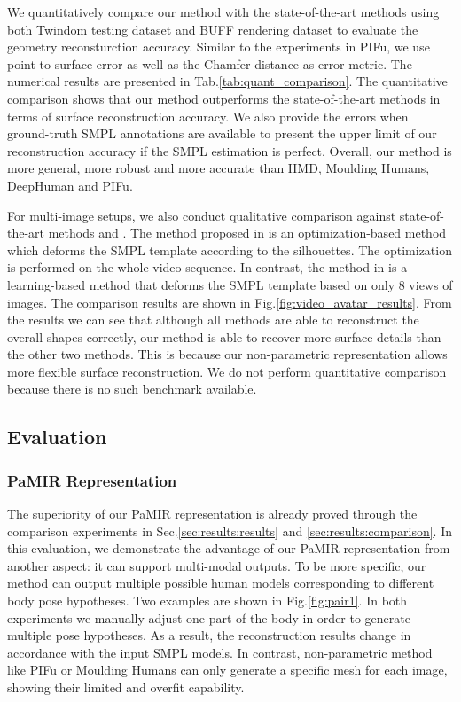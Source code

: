 We quantitatively compare our method with the state-of-the-art methods using both Twindom testing dataset and BUFF rendering dataset to evaluate the geometry reconsturction accuracy. 
Similar to the experiments in PIFu\cite{pifuSHNMKL19}, we use point-to-surface error as well as the Chamfer distance as error metric. 
The numerical results are presented in Tab.\ref{tab:quant_comparison}. The quantitative comparison shows that our method outperforms the state-of-the-art methods in terms of surface reconstruction accuracy. 
We also provide the errors when ground-truth SMPL annotations are available to present the upper limit of our reconstruction accuracy if the SMPL estimation is perfect. Overall, our method is more general, more robust and more accurate than HMD\cite{HMD2019},  Moulding Humans\cite{MouldingHumans2019}, DeepHuman\cite{Zheng2019DeepHuman} and PIFu\cite{pifuSHNMKL19}. 






For multi-image setups, we also conduct qualitative comparison against state-of-the-art methods \cite{VideoAvater} and \cite{alldieck19cvpr}. 
The method proposed in \cite{VideoAvater} is an optimization-based method which deforms the SMPL template according to the silhouettes.
The optimization is performed on the whole video sequence. 
In contrast, the method in \cite{alldieck19cvpr} is a learning-based method that deforms the SMPL template based on only 8 views of images. 
The comparison results are shown in Fig.\ref{fig:video_avatar_results}. 
From the results we can see that although all methods are able to reconstruct the overall shapes correctly, our method is able to recover more surface details than the other two methods. 
This is because our non-parametric representation allows more flexible surface reconstruction. 
We do not perform quantitative comparison because there is no such benchmark available. 


\subsection{Evaluation}
\label{sec:results:ablation}


\subsubsection{PaMIR Representation}


The superiority of our PaMIR representation is already proved through the comparison experiments in Sec.\ref{sec:results:results} and \ref{sec:results:comparison}. In this evaluation, we demonstrate the advantage of our PaMIR representation from another aspect: it can support multi-modal outputs. To be more specific, our method can output multiple possible human models corresponding to different body pose hypotheses. Two examples are shown in Fig.\ref{fig:pair1}. In both experiments we manually adjust one part of the body in order to generate multiple pose hypotheses. As a result, the reconstruction results change in accordance with the input SMPL models. In contrast, non-parametric method like PIFu\cite{pifuSHNMKL19} or Moulding Humans\cite{MouldingHumans2019} can only generate a specific mesh for each image, showing their limited and overfit capability. 


